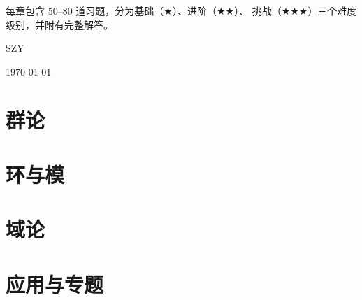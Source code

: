 \documentclass[12pt, a4paper, openany]{book}
\begin{document}
每章包含 50--80 道习题，分为基础（$\bigstar$）、进阶（$\bigstar\bigstar$）、
挑战（$\bigstar\bigstar\bigstar$）三个难度级别，并附有完整解答。

\vspace{1cm}
\hfill SZY

\hfill \today

\tableofcontents
\newpage

\part{群论}






\part{环与模}





\part{域论}




\part{应用与专题}



\appendix




\printindex
\end{document}
